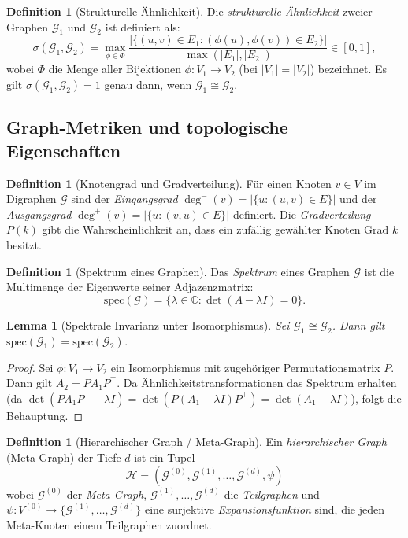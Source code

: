 ﻿\documentclass[12pt,a4paper]{article}
\theoremstyle{plain}
\newtheorem{lemma}[theorem]{Lemma}
\theoremstyle{definition}
\newtheorem{definition}[theorem]{Definition}
\theoremstyle{remark}
\newcommand{\GG}{\mathcal{G}}
\newcommand{\HH}{\mathcal{H}}
\begin{document}
\begin{definition}[Strukturelle Ähnlichkeit]
\label{def:aehnlichkeit}
Die \emph{strukturelle Ähnlichkeit} zweier Graphen $\GG_1$ und $\GG_2$ ist definiert als:
\[
  \sigma(\GG_1, \GG_2) = \max_{\phi \in \Phi} \frac{\left|\{(u,v) \in E_1 : (\phi(u), \phi(v)) \in E_2\}\right|}{\max(|E_1|, |E_2|)} \in [0,1],
\]
wobei $\Phi$ die Menge aller Bijektionen $\phi: V_1 \to V_2$ (bei $|V_1|=|V_2|$) bezeichnet. Es gilt $\sigma(\GG_1, \GG_2) = 1$ genau dann, wenn $\GG_1 \cong \GG_2$.
\end{definition}

\subsection{Graph-Metriken und topologische Eigenschaften}

\begin{definition}[Knotengrad und Gradverteilung]
\label{def:grad}
Für einen Knoten $v \in V$ im Digraphen $\GG$ sind der \emph{Eingangsgrad} $\deg^-(v) = |\{u : (u,v) \in E\}|$ und der \emph{Ausgangsgrad} $\deg^+(v) = |\{u : (v,u) \in E\}|$ definiert. Die \emph{Gradverteilung} $P(k)$ gibt die Wahrscheinlichkeit an, dass ein zufällig gewählter Knoten Grad $k$ besitzt.
\end{definition}

\begin{definition}[Spektrum eines Graphen]
\label{def:spektrum}
Das \emph{Spektrum} eines Graphen $\GG$ ist die Multimenge der Eigenwerte seiner Adjazenzmatrix:
\[
  \text{spec}(\GG) = \{\lambda \in \mathbb{C} : \det(A - \lambda I) = 0\}.
\]
\end{definition}

\begin{lemma}[Spektrale Invarianz unter Isomorphismus]
\label{lem:spektrum}
Sei $\GG_1 \cong \GG_2$. Dann gilt $\text{spec}(\GG_1) = \text{spec}(\GG_2)$.
\end{lemma}

\begin{proof}
Sei $\phi: V_1 \to V_2$ ein Isomorphismus mit zugehöriger Permutationsmatrix $P$. Dann gilt $A_2 = P A_1 P^\top$. Da Ähnlichkeitstransformationen das Spektrum erhalten (da $\det(PA_1P^\top - \lambda I) = \det(P(A_1-\lambda I)P^\top) = \det(A_1 - \lambda I)$), folgt die Behauptung.
\end{proof}

\begin{definition}[Hierarchischer Graph / Meta-Graph]
\label{def:metagraph}
Ein \emph{hierarchischer Graph} (Meta-Graph) der Tiefe $d$ ist ein Tupel
\[
  \HH = (\GG^{(0)}, \GG^{(1)}, \ldots, \GG^{(d)}, \psi)
\]
wobei $\GG^{(0)}$ der \emph{Meta-Graph}, $\GG^{(1)}, \ldots, \GG^{(d)}$ die \emph{Teilgraphen} und $\psi: V^{(0)} \to \{\GG^{(1)}, \ldots, \GG^{(d)}\}$ eine surjektive \emph{Expansionsfunktion} sind, die jeden Meta-Knoten einem Teilgraphen zuordnet.
\end{definition}
\end{document}
